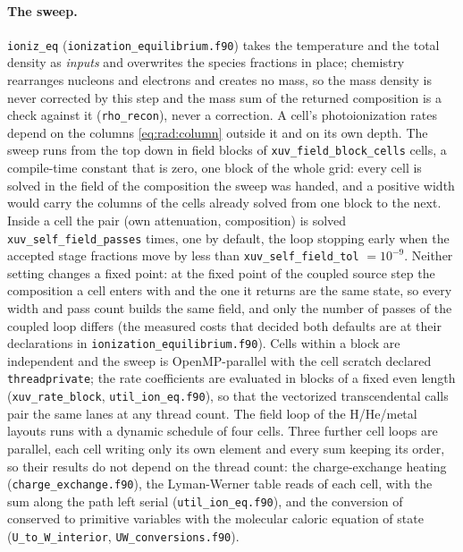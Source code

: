 \paragraph{The sweep.} \texttt{ioniz\_eq} (\texttt{ionization\_equilibrium.f90})
takes the temperature and the total density as \emph{inputs} and overwrites
the species fractions in place; chemistry rearranges nucleons and electrons
and creates no mass, so the mass density is never corrected by this step and
the mass sum of the returned composition is a check against it
(\texttt{rho\_recon}), never a correction. A cell's photoionization rates
depend on the columns \eqref{eq:rad:column} outside it and on its own depth.
The sweep runs from the top down in field blocks of
\texttt{xuv\_field\_block\_cells} cells, a compile-time constant that is zero,
one block of the whole grid: every cell is solved in the field of the
composition the sweep was handed, and a positive width would carry the
columns of the cells already solved from one block to the next. Inside a cell
the pair (own attenuation, composition) is solved
\texttt{xuv\_self\_field\_passes} times, one by default, the loop stopping
early when the accepted stage fractions move by less than
\texttt{xuv\_self\_field\_tol} $=10^{-9}$. Neither setting changes a fixed
point: at the fixed point of the coupled source step the composition a cell
enters with and the one it returns are the same state, so every width and
pass count builds the same field, and only the number of passes of the
coupled loop differs (the measured costs that decided both defaults are at
their declarations in \texttt{ionization\_equilibrium.f90}). Cells within a
block are independent and the sweep is OpenMP-parallel with the cell
scratch declared \texttt{threadprivate}; the rate coefficients are evaluated
in blocks of a fixed even length (\texttt{xuv\_rate\_block},
\texttt{util\_ion\_eq.f90}), so that the vectorized transcendental calls pair
the same lanes at any thread count.  The field loop of the H/He/metal
layouts runs with a dynamic schedule of four cells.  Three further cell
loops are parallel, each cell writing only its own element and every sum
keeping its order, so their results do not depend on the thread count: the
charge-exchange heating (\texttt{charge\_exchange.f90}), the Lyman-Werner
table reads of each cell, with the sum along the path left serial
(\texttt{util\_ion\_eq.f90}), and the conversion of conserved to primitive
variables with the molecular caloric equation of state
(\texttt{U\_to\_W\_interior}, \texttt{UW\_conversions.f90}).

